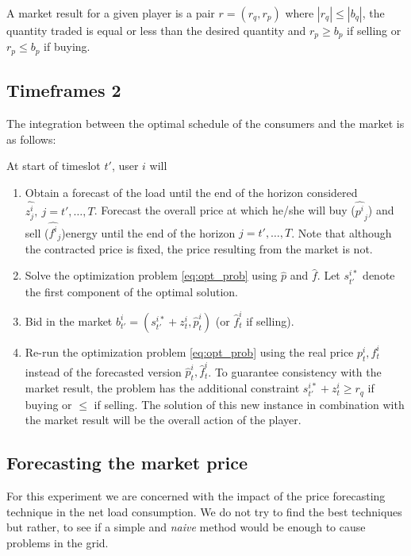 \documentclass{article}
\begin{document}
A market result for a given player is a pair $r = (r_q, r_p)$ where $|r_q| \leq |b_q|$, the quantity traded is equal or less than the desired quantity and $r_p \geq b_p$ if selling or $r_p \leq b_p$ if buying.

\subsection{Timeframes 2}

The integration between the optimal schedule of the consumers and the market is as follows:

At start of timeslot $t'$, user $i$ will
\begin{enumerate}
\item Obtain a forecast of the load until the end of the horizon considered $\hat{z^i_j}, \ j=t',\dots, T$. Forecast the overall price at which he/she will buy ($\hat{p^i}_j$) and sell ($\hat{f^i}_j$)energy until the end of the horizon $j=t', \dots, T$. Note that although the contracted price is fixed, the price resulting from the market is not.
	\item Solve the optimization problem \eqref{eq:opt_prob} using $\hat{p}$ and $\hat{f}$. Let $s^{i*}_{t'}$ denote the first component of the optimal solution.
	\item Bid in the market $b^i_{t'} = (s^{i*}_{t'} + z^i_t, \hat{p}^i_t)$ (or $\hat{f}^i_t$ if selling).
	\item Re-run the optimization problem \eqref{eq:opt_prob} using the real price $p^i_t, f^i_t$ instead of the forecasted version $\hat{p}^i_t, \hat{f}^i_t$. To guarantee consistency with the market result, the problem has the additional constraint $s^{i*}_{t'} + z^i_t \geq r_q$ if buying or $\leq$ if selling. The solution of this new instance in combination with the market result will be the overall action of the player.
\end{enumerate}

\subsection{Forecasting the market price}

For this experiment we are concerned with the impact of the price forecasting technique in the net load consumption. We do not try to find the best techniques but rather, to see if a simple and \textit{naive} method would be enough to cause problems in the grid.
\end{document}
